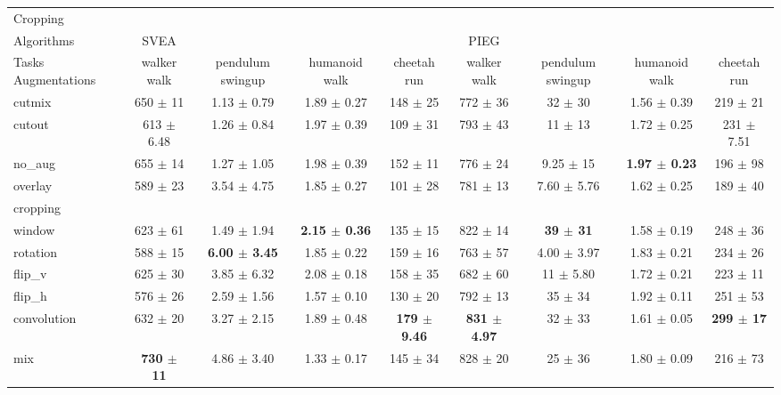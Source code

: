 \begin{tabular}{lcccccccc}
Cropping & & & & & & & & \\
Algorithms & SVEA & & & & PIEG & & & \\
Tasks Augmentations & walker walk & pendulum swingup & humanoid walk & cheetah run & walker walk & pendulum swingup & humanoid walk & cheetah run \\
cutmix          & 650 $\pm$ 11 & 1.13 $\pm$ 0.79 & 1.89 $\pm$ 0.27 & 148 $\pm$ 25 & 772 $\pm$ 36 & 32 $\pm$ 30 & 1.56 $\pm$ 0.39 & 219 $\pm$ 21 \\
cutout          & 613 $\pm$ 6.48 & 1.26 $\pm$ 0.84 & 1.97 $\pm$ 0.39 & 109 $\pm$ 31 & 793 $\pm$ 43 & 11 $\pm$ 13 & 1.72 $\pm$ 0.25 & 231 $\pm$ 7.51 \\
no\_aug         & 655 $\pm$ 14 & 1.27 $\pm$ 1.05 & 1.98 $\pm$ 0.39 & 152 $\pm$ 11 & 776 $\pm$ 24 & 9.25 $\pm$ 15 & \textbf{1.97 $\pm$ 0.23} & 196 $\pm$ 98 \\
overlay         & 589 $\pm$ 23 & 3.54 $\pm$ 4.75 & 1.85 $\pm$ 0.27 & 101 $\pm$ 28 & 781 $\pm$ 13 & 7.60 $\pm$ 5.76 & 1.62 $\pm$ 0.25 & 189 $\pm$ 40 \\
cropping        &  &  &  &  &  &  &  &  \\
window          & 623 $\pm$ 61 & 1.49 $\pm$ 1.94 & \textbf{2.15 $\pm$ 0.36} & 135 $\pm$ 15 & 822 $\pm$ 14 & \textbf{39 $\pm$ 31} & 1.58 $\pm$ 0.19 & 248 $\pm$ 36 \\
rotation        & 588 $\pm$ 15 & \textbf{6.00 $\pm$ 3.45} & 1.85 $\pm$ 0.22 & 159 $\pm$ 16 & 763 $\pm$ 57 & 4.00 $\pm$ 3.97 & 1.83 $\pm$ 0.21 & 234 $\pm$ 26 \\
flip\_v         & 625 $\pm$ 30 & 3.85 $\pm$ 6.32 & 2.08 $\pm$ 0.18 & 158 $\pm$ 35 & 682 $\pm$ 60 & 11 $\pm$ 5.80 & 1.72 $\pm$ 0.21 & 223 $\pm$ 11 \\
flip\_h         & 576 $\pm$ 26 & 2.59 $\pm$ 1.56 & 1.57 $\pm$ 0.10 & 130 $\pm$ 20 & 792 $\pm$ 13 & 35 $\pm$ 34 & 1.92 $\pm$ 0.11 & 251 $\pm$ 53 \\
convolution     & 632 $\pm$ 20 & 3.27 $\pm$ 2.15 & 1.89 $\pm$ 0.48 & \textbf{179 $\pm$ 9.46} & \textbf{831 $\pm$ 4.97} & 32 $\pm$ 33 & 1.61 $\pm$ 0.05 & \textbf{299 $\pm$ 17} \\
mix             & \textbf{730 $\pm$ 11} & 4.86 $\pm$ 3.40 & 1.33 $\pm$ 0.17 & 145 $\pm$ 34 & 828 $\pm$ 20 & 25 $\pm$ 36 & 1.80 $\pm$ 0.09 & 216 $\pm$ 73 \\
\end{tabular}